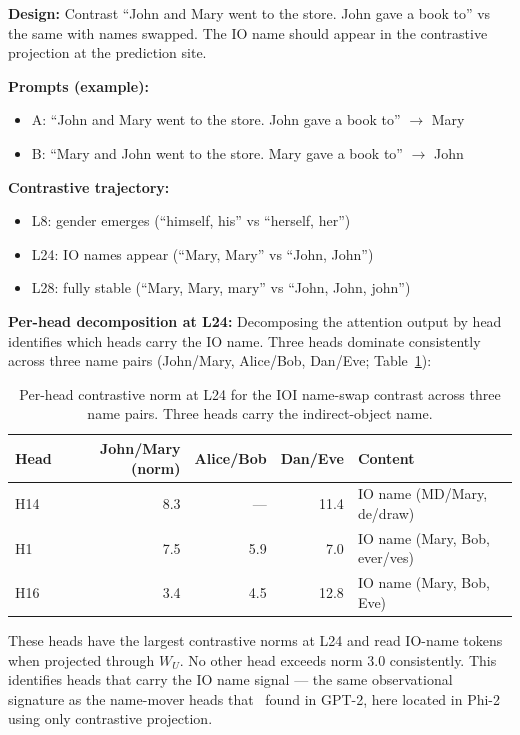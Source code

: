\documentclass[11pt]{article}
\newcommand{\WU}{W_U}
\begin{document}
\textbf{Design:} Contrast ``John and Mary went to the store. John gave a book to'' vs
the same with names swapped. The IO name should appear in the contrastive
projection at the prediction site.

\textbf{Prompts (example):}
\begin{itemize}[leftmargin=*]
\item A: ``John and Mary went to the store. John gave a book to'' $\rightarrow$ Mary
\item B: ``Mary and John went to the store. Mary gave a book to'' $\rightarrow$ John
\end{itemize}

\textbf{Contrastive trajectory:}
\begin{itemize}[leftmargin=*]
\item L8: gender emerges (``himself, his'' vs ``herself, her'')
\item L24: IO names appear (``Mary, Mary'' vs ``John, John'')
\item L28: fully stable (``Mary, Mary, mary'' vs ``John, John, john'')
\end{itemize}

\textbf{Per-head decomposition at L24:} Decomposing the attention output by head
identifies which heads carry the IO name. Three heads dominate consistently
across three name pairs (John/Mary, Alice/Bob, Dan/Eve; Table~\ref{tab:ioi-heads}):

\begin{table}[htbp]
\centering
\small
\begin{tabular}{lrrrl}
\toprule
Head & John/Mary (norm) & Alice/Bob & Dan/Eve & Content \\
\midrule
H14 & 8.3 & --- & 11.4 & IO name (MD/Mary, de/draw) \\
H1 & 7.5 & 5.9 & 7.0 & IO name (Mary, Bob, ever/ves) \\
H16 & 3.4 & 4.5 & 12.8 & IO name (Mary, Bob, Eve) \\
\bottomrule
\end{tabular}
\caption{Per-head contrastive norm at L24 for the IOI name-swap contrast across three name pairs. Three heads carry the indirect-object name.}
\label{tab:ioi-heads}
\end{table}

These heads have the largest contrastive norms at L24 and read IO-name tokens
when projected through $\WU$. No other head exceeds norm 3.0 consistently. This
identifies heads that carry the IO name signal --- the same observational
signature as the name-mover heads that~\citet{wang2023} found in GPT-2, here
located in Phi-2 using only contrastive projection.
\end{document}
